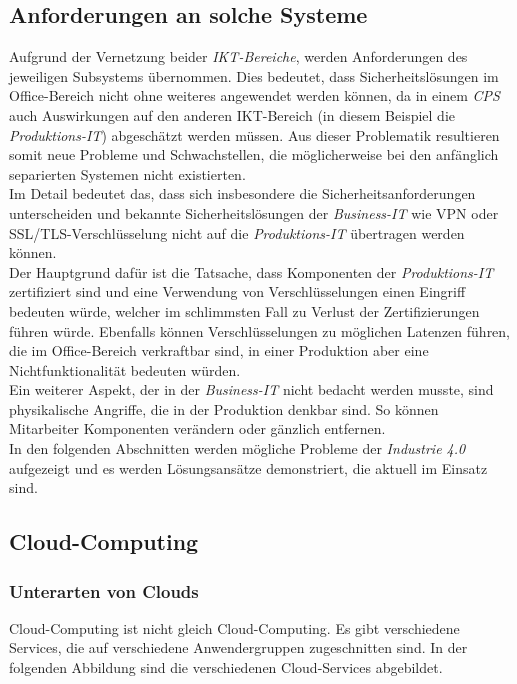 \documentclass[conference]{IEEEtran}
\begin{document}
\subsection{Anforderungen an solche Systeme}
Aufgrund der Vernetzung beider \textit{IKT-Bereiche}, werden Anforderungen des jeweiligen Subsystems übernommen. Dies bedeutet, dass Sicherheitslösungen im Office-Bereich nicht ohne weiteres angewendet werden können, da in einem \textit{CPS} auch Auswirkungen auf den anderen IKT-Bereich (in diesem Beispiel die \textit{Produktions-IT}) abgeschätzt werden müssen. Aus dieser Problematik resultieren somit neue Probleme und Schwachstellen, die möglicherweise bei den anfänglich separierten Systemen nicht existierten.\\
Im Detail bedeutet das, dass sich insbesondere die Sicherheitsanforderungen unterscheiden und bekannte Sicherheitslösungen der \textit{Business-IT} wie VPN oder SSL/TLS-Verschlüsselung nicht auf die \textit{Produktions-IT} übertragen werden können.\\
Der Hauptgrund dafür ist die Tatsache, dass Komponenten der \textit{Produktions-IT} zertifiziert sind und eine Verwendung von Verschlüsselungen einen Eingriff bedeuten würde, welcher im schlimmsten Fall zu Verlust der Zertifizierungen führen würde. Ebenfalls können Verschlüsselungen zu möglichen Latenzen führen, die im Office-Bereich verkraftbar sind, in einer Produktion aber eine Nichtfunktionalität bedeuten würden.\\
Ein weiterer Aspekt, der in der \textit{Business-IT} nicht bedacht werden musste, sind physikalische Angriffe, die in der Produktion denkbar sind. So können Mitarbeiter Komponenten verändern oder gänzlich entfernen. \cite{eckert2015}    
\vspace{0.3cm}
\\
In den folgenden Abschnitten werden mögliche Probleme der \textit{Industrie 4.0} aufgezeigt und es werden Lösungsansätze demonstriert, die aktuell im Einsatz sind.

\subsection{Cloud-Computing}

\subsubsection{Unterarten von Clouds}
Cloud-Computing ist nicht gleich Cloud-Computing. Es gibt verschiedene Services, die auf verschiedene Anwendergruppen zugeschnitten sind. In der folgenden Abbildung sind die verschiedenen Cloud-Services abgebildet. 
\end{document}
